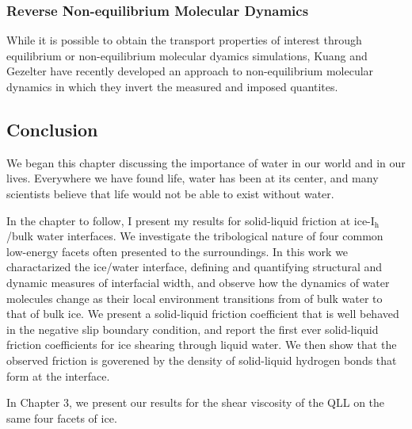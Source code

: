 \subsubsection{Reverse Non-equilibrium Molecular Dynamics}
While it is possible to obtain the transport properties of interest
through equilibrium or non-equilibrium molecular dyamics simulations,
Kuang and Gezelter have recently developed an approach to
non-equilibrium molecular dynamics in which they invert the measured
and imposed quantites. 


\subsection{Conclusion}
We began this chapter discussing the importance of water in our world
and in our lives. Everywhere we have found life, water has been at its
center, and many scientists believe that life would not be able to
exist without water. 

In the chapter to follow, I present my results for solid-liquid
friction at ice-I$_\mathrm{h}$/bulk water interfaces. We investigate
the tribological nature of four common low-energy facets often
presented to the surroundings. In this work we charactarized the
ice/water interface, defining and quantifying structural and dynamic
measures of interfacial width, and observe how the dynamics of water
molecules change as their local environment transitions from of bulk
water to that of bulk ice. We present a solid-liquid friction
coefficient that is well behaved in the negative slip boundary
condition, and report the first ever solid-liquid friction
coefficients for ice shearing through liquid water. We then show that
the observed friction is goverened by the density of solid-liquid
hydrogen bonds that form at the interface.

In Chapter 3, we present our results for the shear viscosity of the
QLL on the same four facets of ice.

